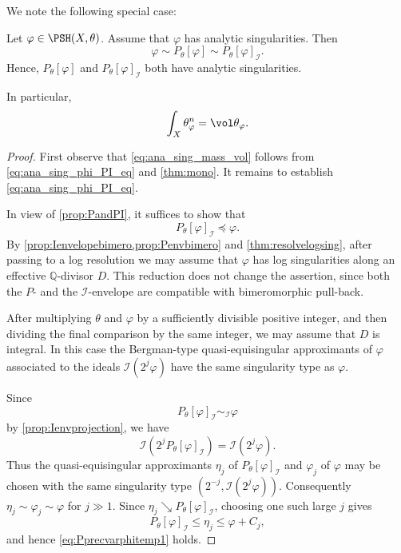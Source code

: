We note the following special case:
\begin{proposition}\label{prop:analysingcompPandPI}
    Let $\varphi\in \PSH(X,\theta)$. Assume that $\varphi$ has analytic singularities. Then
    \begin{equation}\label{eq:ana_sing_phi_PI_eq}
        \varphi\sim P_{\theta}[\varphi] \sim P_{\theta}[\varphi]_{\mathcal{I}}.
    \end{equation}
    Hence, $P_{\theta}[\varphi]$ and $P_{\theta}[\varphi]_{\mathcal{I}}$ both have analytic singularities.

    In particular,
    \begin{equation}\label{eq:ana_sing_mass_vol}
        \int_X \theta_{\varphi}^n= \vol \theta_{\varphi}.
    \end{equation}
\end{proposition}
\begin{proof}
    First observe that \eqref{eq:ana_sing_mass_vol} follows from \eqref{eq:ana_sing_phi_PI_eq} and \cref{thm:mono}. It remains to establish \eqref{eq:ana_sing_phi_PI_eq}.

    In view of \cref{prop:PandPI}, it suffices to show that
    \begin{equation}\label{eq:Pprecvarphitemp1}
        P_{\theta}[\varphi]_{\mathcal{I}}\preceq \varphi.
    \end{equation}
    By \cref{prop:Ienvelopebimero,prop:Penvbimero} and \cref{thm:resolvelogsing}, after passing to a log resolution we may assume that $\varphi$ has log singularities along an effective $\mathbb Q$-divisor $D$. This reduction does not change the assertion, since both the $P$- and the $\mathcal I$-envelope are compatible with bimeromorphic pull-back.

    After multiplying $\theta$ and $\varphi$ by a sufficiently divisible positive integer, and then dividing the final comparison by the same integer, we may assume that $D$ is integral. In this case the Bergman-type quasi-equisingular approximants of $\varphi$ associated to the ideals $\mathcal I(2^j\varphi)$ have the same singularity type as $\varphi$.

    Since
    \[
        P_\theta[\varphi]_{\mathcal I}\sim_{\mathcal I}\varphi
    \]
    by \cref{prop:Ienvprojection}, we have
    \[
        \mathcal I(2^jP_\theta[\varphi]_{\mathcal I})=\mathcal I(2^j\varphi).
    \]
    Thus the quasi-equisingular approximants $\eta_j$ of $P_\theta[\varphi]_{\mathcal I}$ and $\varphi_j$ of $\varphi$ may be chosen with the same singularity type $(2^{-j},\mathcal I(2^j\varphi))$.
    Consequently $\eta_j\sim\varphi_j\sim\varphi$ for $j\gg1$. Since $\eta_j\searrow P_\theta[\varphi]_{\mathcal I}$, choosing one such large $j$ gives
    \[
        P_\theta[\varphi]_{\mathcal I}\leq \eta_j\leq \varphi+C_j,
    \]
    and hence \eqref{eq:Pprecvarphitemp1} holds.
\end{proof}



